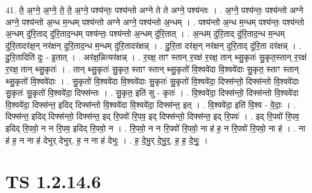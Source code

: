 \documentclass[17pt]{extarticle}
\begin{document}
41. ते॒ अ॒ग्ने॒ अ॒ग्ने॒ ते॒ ते॒ अ॒ग्ने॒ पश्य॑न्तः॒ पश्य॑न्तो अग्ने ते ते अग्ने॒ पश्य॑न्तः । . अ॒ग्ने॒ पश्य॑न्तः॒ पश्य॑न्तो अग्ने अग्ने॒ पश्य॑न्तो अ॒न्ध म॒न्धम् पश्य॑न्तो अग्ने अग्ने॒ पश्य॑न्तो अ॒न्धम् । . पश्य॑न्तो अ॒न्ध म॒न्धम् पश्य॑न्तः॒ पश्य॑न्तो अ॒न्धम् दु॑रि॒ताद् दु॑रि॒ताद॒न्धम् पश्य॑न्तः॒ पश्य॑न्तो अ॒न्धम् दु॑रि॒तात् । . अ॒न्धम् दु॑रि॒ताद् दु॑रि॒ताद॒न्ध म॒न्धम् दु॑रि॒तादर॑क्ष॒न् नर॑क्षन् दुरि॒ताद॒न्ध म॒न्धम् दु॑रि॒तादर॑क्षन्न् । . दु॒रि॒ता दर॑क्ष॒न् नर॑क्षन् दुरि॒ताद् दु॑रि॒ता दर॑क्षन्न् । . दु॒रि॒तादिति॑ दुः - इ॒तात् । . अर॑क्ष॒न्नित्यर॑क्षन्न् । . र॒रक्ष॒ ताꣳ स्तान् र॒रक्ष॑ र॒रक्ष॒ तान् थ्सु॒कृतः॑ सु॒कृत॒स्तान् र॒रक्ष॑ र॒रक्ष॒ तान् थ्सु॒कृतः॑ । . तान् थ्सु॒कृतः॑ सु॒कृत॒ स्ताꣳ स्तान् थ्सु॒कृतो॑ वि॒श्ववे॑दा वि॒श्ववे॑दाः सु॒कृत॒ स्ताꣳ स्तान् थ्सु॒कृतो॑ वि॒श्ववे॑दाः । . सु॒कृतो॑ वि॒श्ववे॑दा वि॒श्ववे॑दाः सु॒कृतः॑ सु॒कृतो॑ वि॒श्ववे॑दा॒ दिफ्स॑न्तो॒ दिफ्स॑न्तो वि॒श्ववे॑दाः सु॒कृतः॑ सु॒कृतो॑ वि॒श्ववे॑दा॒ दिफ्स॑न्तः । . सु॒कृत॒ इति॑ सु - कृतः॑ । . वि॒श्ववे॑दा॒ दिफ्स॑न्तो॒ दिफ्स॑न्तो वि॒श्ववे॑दा वि॒श्ववे॑दा॒ दिफ्स॑न्त॒ इदिद् दिफ्स॑न्तो वि॒श्ववे॑दा वि॒श्ववे॑दा॒ दिफ्स॑न्त॒ इत् । . वि॒श्ववे॑दा॒ इति॑ वि॒श्व - वे॒दाः॒ । . दिफ्स॑न्त॒ इदिद् दिफ्स॑न्तो॒ दिफ्स॑न्त॒ इद् रि॒पवो॑ रि॒पव॒ इद् दिफ्स॑न्तो॒ दिफ्स॑न्त॒ इद् रि॒पवः॑ । . इद् रि॒पवो॑ रि॒पव॒ इदिद् रि॒पवो॒ न न रि॒पव॒ इदिद् रि॒पवो॒ न । . रि॒पवो॒ न न रि॒पवो॑ रि॒पवो॒ ना ह॑ ह॒ न रि॒पवो॑ रि॒पवो॒ ना ह॑ । . ना ह॑ ह॒ न ना ह॑ देभुर् देभुर्. ह॒ न ना ह॑ देभुः । . ह॒ दे॒भु॒र् दे॒भु॒र्॒. ह॒ ह॒ दे॒भुः॒ । \newline
\pagebreak
{}
\section*{ TS 1.2.14.6 }
\end{document}
